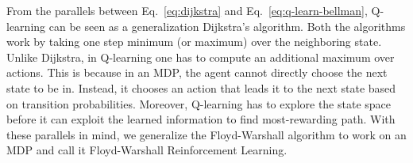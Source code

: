 From the parallels between Eq.~\eqref{eq:dijkstra} and
Eq.~\eqref{eq:q-learn-bellman}, Q-learning can be seen as a generalization
Dijkstra's algorithm. Both the algorithms work by taking one step minimum (or
maximum) over the neighboring state. Unlike Dijkstra, in Q-learning one has to
compute an additional maximum over actions. This is because in an MDP, the agent
cannot directly choose the next state to be in. Instead, it chooses an action
that leads it to the next state based on transition probabilities. Moreover,
Q-learning has to explore the state space before it can exploit the learned
information to find most-rewarding path. With these parallels in mind, we
generalize the Floyd-Warshall algorithm to work on an MDP and call it
Floyd-Warshall Reinforcement Learning.

